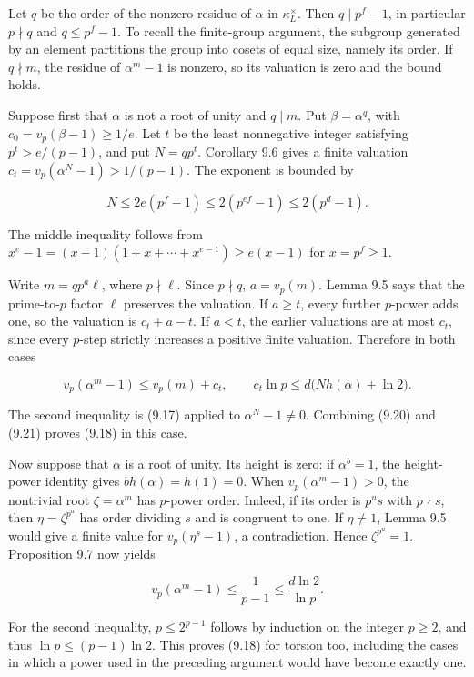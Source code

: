 \documentclass[
  11pt,
  a4paper,
]{article}
\begin{document}
Let \(q\) be the order of the nonzero residue of \(\alpha\) in
\(\kappa_L^\times\). Then \(q\mid p^f-1\), in particular \(p\nmid q\)
and \(q\le p^f-1\). To recall the finite-group argument, the subgroup
generated by an element partitions the group into cosets of equal size,
namely its order. If \(q\nmid m\), the residue of \(\alpha^m-1\) is
nonzero, so its valuation is zero and the bound holds.

Suppose first that \(\alpha\) is not a root of unity and \(q\mid m\).
Put \(\beta=\alpha^q\), with \(c_0=v_p(\beta-1)\ge1/e\). Let \(t\) be
the least nonnegative integer satisfying \(p^t>e/(p-1)\), and put
\(N=qp^t\). Corollary 9.6 gives a finite valuation
\(c_t=v_p(\alpha^N-1)>1/(p-1)\). The exponent is bounded by

\[
N\le2e(p^f-1)\le2(p^{ef}-1)\le2(p^d-1).
\tag{9.20}
\]

The middle inequality follows from
\(x^e-1=(x-1)(1+x+\cdots+x^{e-1})\ge e(x-1)\) for \(x=p^f\ge1\).

Write \(m=q p^a\ell\), where \(p\nmid\ell\). Since \(p\nmid q\),
\(a=v_p(m)\). Lemma 9.5 says that the prime-to-\(p\) factor \(\ell\)
preserves the valuation. If \(a\ge t\), every further \(p\)-power adds
one, so the valuation is \(c_t+a-t\). If \(a<t\), the earlier valuations
are at most \(c_t\), since every \(p\)-step strictly increases a
positive finite valuation. Therefore in both cases

\[
v_p(\alpha^m-1)\le v_p(m)+c_t,
\qquad
c_t\ln p\le d\bigl(Nh(\alpha)+\ln2\bigr).
\tag{9.21}
\]

The second inequality is (9.17) applied to \(\alpha^N-1\ne0\). Combining
(9.20) and (9.21) proves (9.18) in this case.

Now suppose that \(\alpha\) is a root of unity. Its height is zero: if
\(\alpha^b=1\), the height-power identity gives \(b h(\alpha)=h(1)=0\).
When \(v_p(\alpha^m-1)>0\), the nontrivial root \(\zeta=\alpha^m\) has
\(p\)-power order. Indeed, if its order is \(p^u s\) with \(p\nmid s\),
then \(\eta=\zeta^{p^u}\) has order dividing \(s\) and is congruent to
one. If \(\eta\ne1\), Lemma 9.5 would give a finite value for
\(v_p(\eta^s-1)\), a contradiction. Hence \(\zeta^{p^u}=1\). Proposition
9.7 now yields

\[
v_p(\alpha^m-1)\le\frac1{p-1}\le\frac{d\ln2}{\ln p}.
\tag{9.22}
\]

For the second inequality, \(p\le2^{p-1}\) follows by induction on the
integer \(p\ge2\), and thus \(\ln p\le(p-1)\ln2\). This proves (9.18)
for torsion too, including the cases in which a power used in the
preceding argument would have become exactly one.
\end{document}
